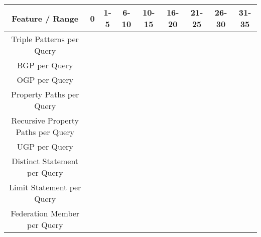 \begin{center}
    \begin{tabular}{|*{9}{c|}}
     \hline
     Feature / Range & 0 & 1-5 & 6-10 & 10-15 & 16-20 & 21-25 & 26-30 & 31-35 \\ 
     \hline \hline
     Triple Patterns per Query & {} & {} & {} & {} & {} & {} & {} & {} \\ 
     \hline
     BGP per Query & {} & {} & {} & {} & {} & {} & {} & {} \\ 
     \hline
     OGP per Query & {} & {} & {} & {} & {} & {} & {} & {} \\ 
     \hline
     Property Paths per Query & {} & {} & {} & {} & {} & {} & {} & {} \\ 
     \hline
     Recursive Property Paths per Query & {} & {} & {} & {} & {} & {} & {} & {} \\ 
     \hline
     UGP per Query & {} & {} & {} & {} & {} & {} & {} & {} \\ 
     \hline
     Distinct Statement per Query & {} & {} & {} & {} & {} & {} & {} & {} \\ 
     \hline
     Limit Statement per Query & {} & {} & {} & {} & {} & {} & {} & {} \\  
     \hline
     Federation Member per Query & {} & {} & {} & {} & {} & {} & {} & {} \\  
     \hline
    \end{tabular}
\end{center}